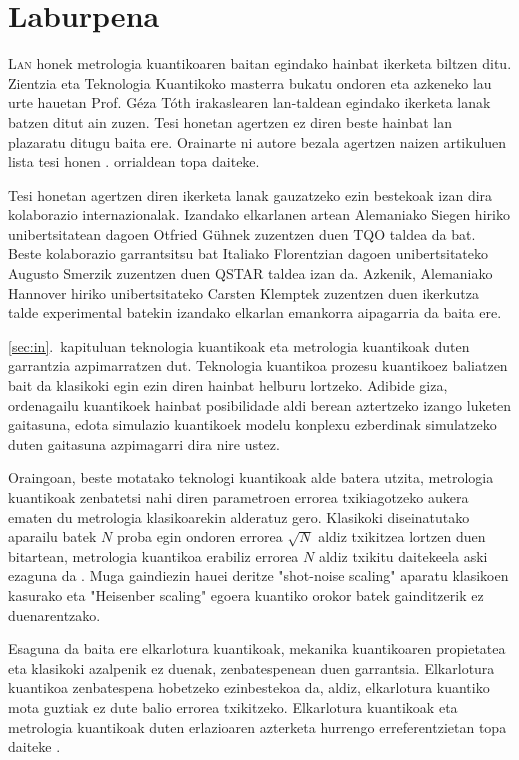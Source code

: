 \section*{Laburpena}
\label{sec:la}

\lettrine[lines=2, findent=3pt,nindent=0pt]{L}{an} honek metrologia kuantikoaren baitan egindako hainbat ikerketa biltzen ditu.
Zientzia eta Teknologia Kuantikoko masterra bukatu ondoren eta azkeneko lau urte hauetan Prof. Géza Tóth irakaslearen lan-taldean egindako ikerketa lanak batzen ditut ain zuzen.
Tesi honetan agertzen ez diren beste hainbat lan plazaratu ditugu baita ere.
Orainarte ni autore bezala agertzen naizen artikuluen lista tesi honen \pageref{sec:pu}. orrialdean topa daiteke.

Tesi honetan agertzen diren ikerketa lanak gauzatzeko ezin bestekoak izan dira kolaborazio internazionalak.
Izandako elkarlanen artean Alemaniako Siegen hiriko unibertsitatean dagoen Otfried Gühnek zuzentzen duen TQO taldea da bat.
Beste kolaborazio garrantsitsu bat Italiako Florentzian dagoen unibertsitateko Augusto Smerzik zuzentzen duen QSTAR taldea izan da.
Azkenik, Alemaniako Hannover hiriko unibertsitateko Carsten Klemptek zuzentzen duen ikerkutza talde experimental batekin izandako elkarlan emankorra aipagarria da baita ere.

\ref{sec:in}.~kapituluan teknologia kuantikoak eta metrologia kuantikoak duten garrantzia azpimarratzen dut.
Teknologia kuantikoa prozesu kuantikoez baliatzen bait da klasikoki egin ezin diren hainbat helburu lortzeko.
Adibide giza, ordenagailu kuantikoek hainbat posibilidade aldi berean aztertzeko izango luketen gaitasuna, edota simulazio kuantikoek modelu konplexu ezberdinak simulatzeko duten gaitasuna azpimagarri dira nire ustez.

Oraingoan, beste motatako teknologi kuantikoak alde batera utzita, metrologia kuantikoak zenbatetsi nahi diren parametroen errorea txikiagotzeko aukera ematen du metrologia klasikoarekin alderatuz gero.
Klasikoki diseinatutako aparailu batek $N$ proba egin ondoren errorea $\sqrt{N}$ aldiz txikitzea lortzen duen bitartean, metrologia kuantikoa erabiliz errorea $N$ aldiz txikitu daitekeela aski ezaguna da \cite{Giovannetti2004, Paris2009}.
Muga gaindiezin hauei deritze "shot-noise scaling" aparatu klasikoen kasurako eta "Heisenber scaling" egoera kuantiko orokor batek gainditzerik ez duenarentzako.

Esaguna da baita ere elkarlotura kuantikoak, mekanika kuantikoaren propietatea eta klasikoki azalpenik ez duenak, zenbatespenean duen garrantsia.
Elkarlotura kuantikoa zenbatespena hobetzeko ezinbestekoa da, aldiz, elkarlotura kuantiko mota guztiak ez dute balio errorea txikitzeko.
Elkarlotura kuantikoak eta metrologia kuantikoak duten erlazioaren azterketa hurrengo erreferentzietan topa daiteke \cite{Pezze2009, Louchet-Chauvet2010, Appel2009, Riedel2010, Gross2010, Luecke2011, Strobel2014, Hyllus2010}.

